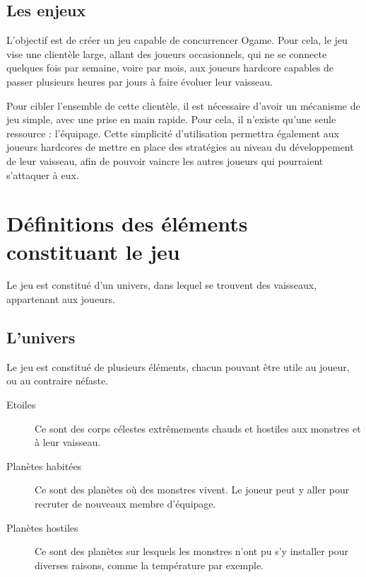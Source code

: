 \documentclass[a4paper,11pt]{report}
\begin{document}
    \section{Les enjeux}
    
    L'objectif est de créer un jeu capable de concurrencer Ogame.
    Pour cela, le jeu vise une clientèle large, allant des joueurs occasionnels, qui ne se connecte quelques fois par semaine, voire par mois, aux joueurs hardcore capables de passer plusieurs heures par jours à faire évoluer leur vaisseau.
    
    Pour cibler l'ensemble de cette clientèle, il est nécessaire d'avoir un mécanisme de jeu simple, avec une prise en main rapide. Pour cela, il n'existe qu'une seule ressource : l'équipage.
    Cette simplicité d'utilisation permettra également aux joueurs hardcores de mettre en place des stratégies au niveau du développement de leur vaisseau, afin de pouvoir vaincre les autres joueurs qui pourraient s'attaquer à eux.


\chapter{Définitions des éléments constituant le jeu}
Le jeu est constitué d'un univers, dans lequel se trouvent des vaisseaux, appartenant aux joueurs.
    \section{L'univers}
    Le jeu est constitué de plusieurs éléments, chacun pouvant être utile au joueur, ou au contraire néfaste.
      \begin{description}
        \item[Etoiles] Ce sont des corps célestes extrêmements chauds et hostiles aux monstres et à leur vaisseau.
        \item[Planètes habitées] Ce sont des planètes où des monstres vivent. Le joueur peut y aller pour recruter de nouveaux membre d'équipage.
        \item[Planètes hostiles] Ce sont des planètes sur lesquels les monstres n'ont pu s'y installer pour diverses raisons, comme la température par exemple.
      \end{description}
      
\end{document}
